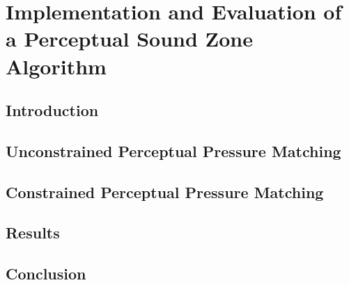\documentclass[10pt,twoside,openright,titlepage]{ce}
\begin{document}
\chapter{Implementation and Evaluation of a Perceptual Sound Zone Algorithm}
\label{ch:perceptual_sound_zone}
\section{Introduction}
\label{ch:perceptual_sound_zone:introduction}

\newpage
\section{Unconstrained Perceptual Pressure Matching}
\label{ch:perceptual_sound_zone:perceptual_minimization}

\newpage
\section{Constrained Perceptual Pressure Matching}
\label{ch:perceptual_sound_zone:perceptual_constraining}

\newpage
\section{Results}
\label{ch:perceptual_sound_zone:results}

\newpage
\section{Conclusion}
\label{ch:perceptual_sound_zone:conclusion}


% 
% 
% 
% 
% 
% 
\end{document}
